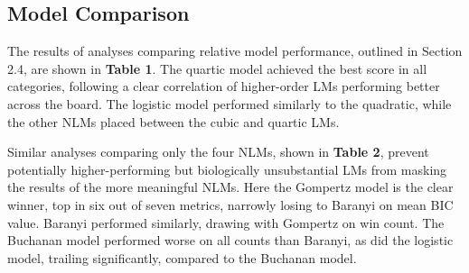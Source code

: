 \documentclass[11pt]{article}
\begin{document}


\subsection{Model Comparison}

The results of analyses comparing relative model performance, outlined in Section 2.4, are shown in \textbf{Table 1}. The quartic model achieved the best score in all categories, following a clear correlation of higher-order LMs performing better across the board. The logistic model performed similarly to the quadratic, while the other NLMs placed between the cubic and quartic LMs. 

Similar analyses comparing only the four NLMs, shown in \textbf{Table 2}, prevent potentially higher-performing but biologically unsubstantial LMs from masking the results of the more meaningful NLMs. Here the Gompertz model is the clear winner, top in six out of seven metrics, narrowly losing to Baranyi on mean BIC value. Baranyi performed similarly, drawing with Gompertz on win count. The Buchanan model performed worse on all counts than Baranyi, as did the logistic model, trailing significantly, compared to the Buchanan model. 

\end{document}
